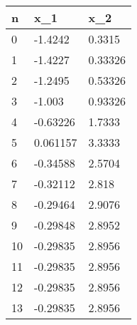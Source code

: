 \begin{tabular}{lll}
n & x_{1} & x_{2} \\ 
\hline 
0 & -1.4242 & 0.3315 \\ 
1 & -1.4227 & 0.33326 \\ 
2 & -1.2495 & 0.53326 \\ 
3 & -1.003 & 0.93326 \\ 
4 & -0.63226 & 1.7333 \\ 
5 & 0.061157 & 3.3333 \\ 
6 & -0.34588 & 2.5704 \\ 
7 & -0.32112 & 2.818 \\ 
8 & -0.29464 & 2.9076 \\ 
9 & -0.29848 & 2.8952 \\ 
10 & -0.29835 & 2.8956 \\ 
11 & -0.29835 & 2.8956 \\ 
12 & -0.29835 & 2.8956 \\ 
13 & -0.29835 & 2.8956 \\ 
\hline 
\end{tabular}